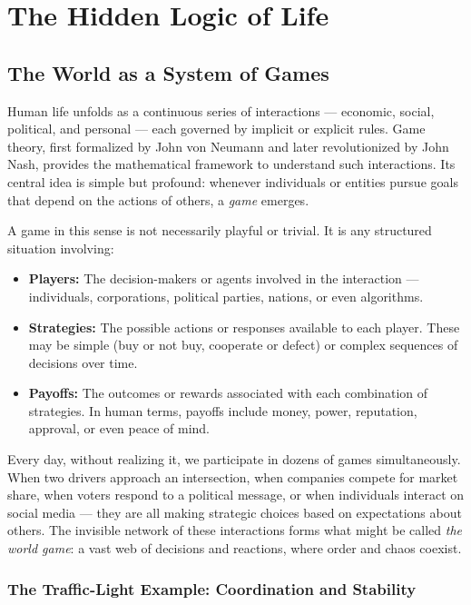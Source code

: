 \documentclass[12pt,twoside]{book}
\begin{document}
\mainmatter

\chapter{The Hidden Logic of Life}
\section{The World as a System of Games}

Human life unfolds as a continuous series of interactions --- economic, social, political, and personal --- each governed by implicit or explicit rules. 
Game theory, first formalized by John von Neumann and later revolutionized by John Nash, provides the mathematical framework to understand such interactions. 
Its central idea is simple but profound: whenever individuals or entities pursue goals that depend on the actions of others, a \emph{game} emerges.

A game in this sense is not necessarily playful or trivial. It is any structured situation involving:
\begin{itemize}
  \item \textbf{Players:} The decision-makers or agents involved in the interaction --- individuals, corporations, political parties, nations, or even algorithms.
  \item \textbf{Strategies:} The possible actions or responses available to each player. These may be simple (buy or not buy, cooperate or defect) or complex sequences of decisions over time.
  \item \textbf{Payoffs:} The outcomes or rewards associated with each combination of strategies. In human terms, payoffs include money, power, reputation, approval, or even peace of mind.
\end{itemize}

Every day, without realizing it, we participate in dozens of games simultaneously.  
When two drivers approach an intersection, when companies compete for market share, when voters respond to a political message, or when individuals interact on social media --- they are all making strategic choices based on expectations about others.  
The invisible network of these interactions forms what might be called \emph{the world game}: a vast web of decisions and reactions, where order and chaos coexist.

\subsection*{The Traffic-Light Example: Coordination and Stability}
\end{document}
